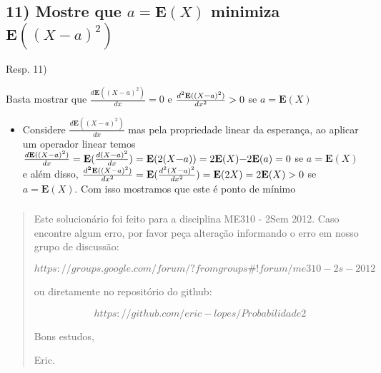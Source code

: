 \documentclass[english]{article}
\begin{document}
\subsubsection*{\textcompwordmark{}}


\subsection*{\textmd{11) Mostre que $a=\mathbf{E}(X)$ minimiza $\mathbf{E}((X-a)^{2})$ }}

Resp. 11) 

Basta mostrar que $\frac{d\mathbf{E}((X-a)^{2})}{dx}=0$ e $\frac{d^{2}\mathbf{E}((X\text{\textminus}a)^{2})}{dx^{2}}>0$
se $a=\mathbf{E}(X)$
\begin{itemize}
\item Considere $\frac{d\mathbf{E}((X-a)^{2})}{dx}$ mas pela propriedade
linear da esperança, ao aplicar um operador linear temos $\frac{d\mathbf{E}((X-a)^{2})}{dx}=\mathbf{E}(\frac{d(X\text{\textminus}a)^{2}}{dx})=\mathbf{E}(2(X\text{\textminus}a))=2\mathbf{E}(X)\text{\textminus}2\mathbf{E}(a)=0$
se $a=\mathbf{E}(X)$ e além disso, $\frac{d\mathbf{^{2}E}((X-a)^{2})}{dx^{2}}=\mathbf{E}(\frac{d^{2}(X\text{\textminus}a)^{2}}{dx^{2}})=\mathbf{E}(2X)=2\mathbf{E}(X)>0$
se $a=\mathbf{E}(X)$. Com isso mostramos que este é ponto de mínimo
\end{itemize}

\subsubsection*{\pagebreak{}}
\begin{quotation}
Este solucionário foi feito para a disciplina ME310 - 2Sem 2012. Caso
encontre algum erro, por favor peça alteração informando o erro em
nosso grupo de discussão: 

$$https://groups.google.com/forum/?fromgroups\#!forum/me310-2s-2012$$

ou diretamente no repositório do github:

$$https://github.com/eric-lopes/Probabilidade2$$

Bons estudos,

Eric.\end{quotation}
\end{document}
